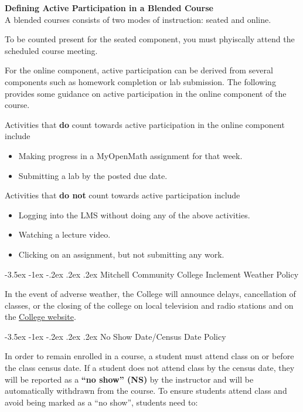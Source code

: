 \documentclass{article}
\makeatletter
\renewcommand\section{\@startsection{section}{1}{0pt}%
  {-3.5ex \@plus -1ex \@minus -.2ex}%
  {.2ex \@plus.2ex}%
  {\normalfont\Large\bfseries}} %
\renewenvironment{framed}[1][]{%
  \def\FrameCommand{%
    \hspace{1pt}%
    {\color{mybordercolor}\vrule width 2pt} %
    \hspace{1pt}%
    \fboxsep=\FrameSep%
    \colorbox{mybgcolor}%
  }%
  \MakeFramed {\advance\hsize-\width \FrameRestore}%
}{%
  \endMakeFramed
}
\makeatother
\begin{document}
\begin{framed}
\textbf{Defining Active Participation in a Blended Course}\\
A blended courses consists of two modes of instruction: seated and online.

To be counted present for the seated component, you must phyiscally attend the scheduled course meeting.

For the online component, active participation can be derived from several components such as homework completion or lab submission. The following provides some guidance on active participation in the online component of the course.

Activities that \textbf{do} count towards active participation in the online component include

\begin{itemize}
\item Making progress in a MyOpenMath assignment for that week.
\item Submitting a lab by the posted due date.
\end{itemize}

Activities that \textbf{do not} count towards active participation include

\begin{itemize}
\item Logging into the LMS without doing any of the above activities.
\item Watching a lecture video.
\item Clicking on an assignment, but not submitting any work.
\end{itemize}
\end{framed}

\section{Mitchell Community College Inclement Weather Policy}

In the event of adverse weather, the College will announce delays, cancellation of classes, or the closing of the college on local television and radio stations and on the \href{https://www.mitchellcc.edu}{College website}.

\section{No Show Date/Census Date Policy}

In order to remain enrolled in a course, a student must attend class on or before the class census date. If a student does not attend class by the census date, they will be reported as a \textbf{``no show'' (NS)} by the instructor and will be automatically withdrawn from the course.  To ensure students attend class and avoid being marked as a ``no show'', students need to:
\end{document}
